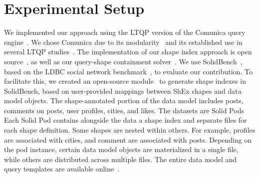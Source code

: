 \section{Experimental Setup}






We implemented our approach using the LTQP version of the Comunica query engine~\cite{taelman_iswc_resources_comunica_2018}.
We chose Comunica due to its modularity~\cite{taelman_swj_componentsjs_2022} and its established use in several LTQP studies~\cite{Bogaerts2021LinkTW, Taelman2023, eschauzier_quweda_linkqueue_2023, Hanski2024, eschauzier_amw_rcubemetric_2024, tam2024opportunitiesshapebasedoptimizationlink}.
The implementation of our shape index approach is open source~, as well as our query-shape containment solver~.
We use SolidBench~\cite{Taelman2023}, based on the LDBC social network benchmark~\cite{Angles2020}, to evaluate our contribution. 
To facilitate this, we created an open-source module~ to generate shape indexes in SolidBench, based on user-provided mappings between ShEx shapes and data model objects.
The shape-annotated portion of the data model includes posts, comments on posts, user profiles, cities, and likes.
The datasets are Solid Pods~\cite{Taelman2023} 
Each Solid Pod contains alongside the data a shape index and separate files for each shape definition.
Some shapes are nested within others. 
For example,  profiles are associated with cities, and comment are associated with posts.
Depending on the pod instance, certain data model objects are materialized in a single file, while others are distributed across multiple files.
The entire data model and query templates are available online~.

